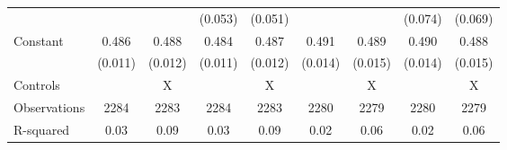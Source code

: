 {\begin{tabular}{l*{8}{c}}
                    &                     &                     &     (0.053)         &     (0.051)         &                     &                     &     (0.074)         &     (0.069)         \\
Constant            &       0.486\sym{***}&       0.488\sym{***}&       0.484\sym{***}&       0.487\sym{***}&       0.491\sym{***}&       0.489\sym{***}&       0.490\sym{***}&       0.488\sym{***}\\
                    &     (0.011)         &     (0.012)         &     (0.011)         &     (0.012)         &     (0.014)         &     (0.015)         &     (0.014)         &     (0.015)         \\
\hline
Controls            &                     &           X         &                     &           X         &                     &           X         &                     &           X         \\
Observations        &        2284         &        2283         &        2284         &        2283         &        2280         &        2279         &        2280         &        2279         \\
R-squared           &        0.03         &        0.09         &        0.03         &        0.09         &        0.02         &        0.06         &        0.02         &        0.06         \\
\hline\hline
\end{tabular}
}
